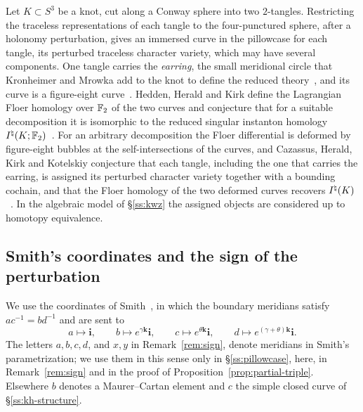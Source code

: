 Let $K\subset S^3$ be a knot, cut along a Conway sphere into two $2$-tangles. Restricting the traceless
representations of each tangle to the four-punctured sphere, after a holonomy perturbation, gives an immersed
curve in the pillowcase for each tangle, its perturbed traceless character variety, which may have several
components. One tangle carries the \emph{earring}, the small meridional circle that Kronheimer and Mrowka add to
the knot to define the reduced theory~\cite{KM2}, and its curve is a figure-eight curve~\cite{HHK2,HK}. Hedden,
Herald and Kirk define the Lagrangian Floer homology over $\mathbb{F}_2$ of the two curves and conjecture that for a
suitable decomposition it is isomorphic to the reduced singular instanton homology
$I^{\natural}(K;\mathbb{F}_2)$~\cite[Conj.~6.5]{HHK2}. For an arbitrary decomposition the Floer differential is deformed by
figure-eight bubbles at the self-intersections of the curves, and Cazassus, Herald, Kirk and Kotelskiy
conjecture that each tangle, including the one that carries the earring, is assigned its perturbed character
variety together with a bounding cochain, and that the Floer homology of the two deformed curves recovers
$I^{\natural}(K)$~\cite[Conj.~D]{CHKK}. In the algebraic model of \S\ref{ss:kwz} the assigned objects are considered up to
homotopy equivalence.

\subsection{Smith's coordinates and the sign of the perturbation}\label{ss:smith-chart}
We use the coordinates of Smith~\cite[\S2.4]{Smith}, in which the
boundary meridians satisfy $ac^{-1}=bd^{-1}$ and are sent to
\begin{equation}\label{eq:smith-coords}
a\mapsto\mathbf i,\qquad b\mapsto e^{\gamma\mathbf k}\mathbf i,\qquad c\mapsto e^{\theta\mathbf k}\mathbf i,\qquad
d\mapsto e^{(\gamma+\theta)\mathbf k}\mathbf i .
\end{equation}
The letters $a,b,c,d$, and $x,y$ in Remark~\ref{rem:sign}, denote meridians in Smith's parametrization; we
use them in this sense only in \S\ref{ss:pillowcase}, here, in Remark~\ref{rem:sign} and in the proof of
Proposition~\ref{prop:partial-triple}. Elsewhere $b$ denotes a Maurer--Cartan element and $c$ the simple
closed curve of \S\ref{ss:kh-structure}.

